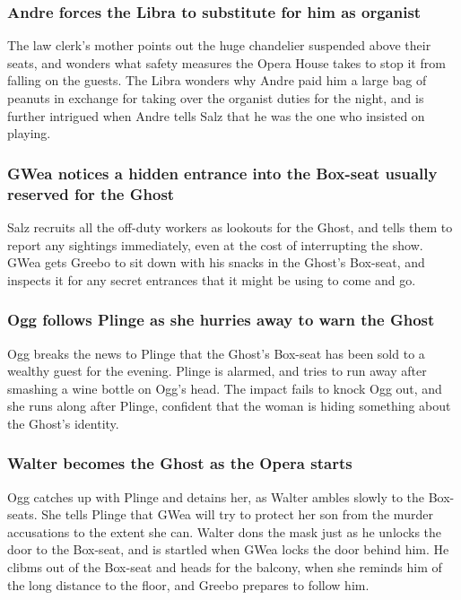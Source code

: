 \subsubsection{\Gls{Andre} forces the \Gls{Libra} to substitute for him as organist}
The law clerk's mother points out the huge chandelier suspended above their seats, and wonders what 
safety measures the Opera House takes to stop it from falling on the guests. The \Gls{Libra} 
wonders why \Gls{Andre} paid him a large bag of peanuts in exchange for taking over the organist 
duties for the night, and is further intrigued when \Gls{Andre} tells \Gls{Salz} that he was the 
one who insisted on playing.

\subsubsection{\Gls{GWea} notices a hidden entrance into the Box-seat usually reserved for the 
\Gls{Ghost}}
\Gls{Salz} recruits all the off-duty workers as lookouts for the \Gls{Ghost}, and tells them to 
report any sightings immediately, even at the cost of interrupting the show. \Gls{GWea} gets 
\Gls{Greebo} to sit down with his snacks in the \Gls{Ghost}'s Box-seat, and inspects it for any 
secret entrances that it might be using to come and go.

\subsubsection{\Gls{Ogg} follows \Gls{Plinge} as she hurries away to warn the \Gls{Ghost}}
\Gls{Ogg} breaks the news to \Gls{Plinge} that the \Gls{Ghost}'s Box-seat has been sold to a wealthy
guest for the evening. \Gls{Plinge} is alarmed, and tries to run away after smashing a wine bottle 
on \Gls{Ogg}'s head. The impact fails to knock \Gls{Ogg} out, and she runs along after \Gls{Plinge},
confident that the woman is hiding something about the \Gls{Ghost}'s identity.

\subsubsection{\Gls{Walter} becomes the \Gls{Ghost} as the Opera starts}
\Gls{Ogg} catches up with \Gls{Plinge} and detains her, as \Gls{Walter} ambles slowly to the 
Box-seats. She tells \Gls{Plinge} that \Gls{GWea} will try to protect her son from the murder 
accusations to the extent she can. \Gls{Walter} dons the mask just as he unlocks the door to the 
Box-seat, and is startled when \Gls{GWea} locks the door behind him. He clibms out of the Box-seat 
and heads for the balcony, when she reminds him of the long distance to the floor, and \Gls{Greebo}
prepares to follow him.

